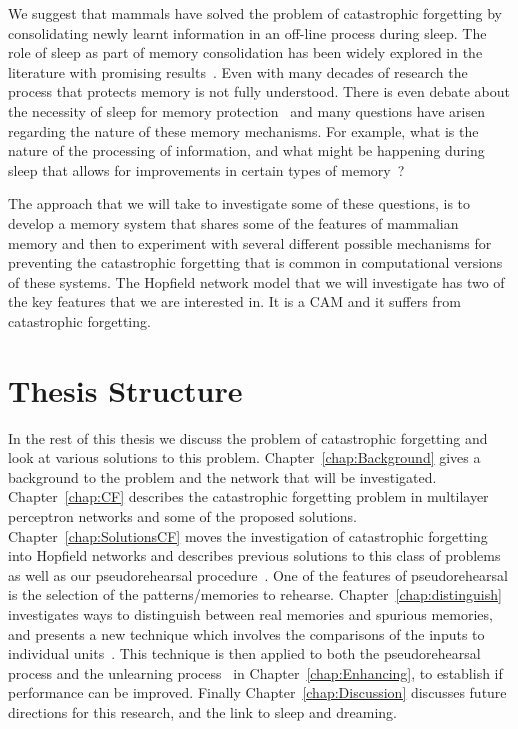 We suggest that mammals have solved the problem of catastrophic forgetting by consolidating newly learnt information in an off-line process during sleep.  The role of sleep as part of memory consolidation has been widely explored in the literature with promising results~\citep{Pearlman71, Pearlman73, Pearlman74, Pearlman79, Fishbein81, Smith91, Smith1993, Smith95, Hennevin95, Hennevin1995a, Smith96, Fishbein97, Meeter2004, Muzur05, Stickgold2005}.  
Even with many decades of research the process that protects memory is not fully understood.  
There is even debate about the necessity of sleep for memory protection~\citep{Siegel2001,Vertes2004,Siegel2005} and many questions have arisen regarding the nature of these memory mechanisms. For example, what is the nature of the processing of information, and what might be happening during sleep that allows for improvements in certain types of memory~\citep{Stickgold2001}?

The approach that we will take to investigate some of these questions, is to develop a memory system that shares some of the features of mammalian memory and then to experiment with several different possible mechanisms for preventing the catastrophic forgetting that is common in computational versions of these systems.  The Hopfield network model that we will investigate has two of the key features that we are interested in.  It is a CAM and it suffers from catastrophic forgetting.

\section{Thesis Structure}

In the rest of this thesis we discuss the problem of catastrophic forgetting and look at various solutions to this problem.  Chapter~\ref{chap:Background} gives a background to the problem and the network that will be investigated. Chapter~\ref{chap:CF} describes the catastrophic forgetting problem in multilayer perceptron networks and some of the proposed solutions. Chapter~\ref{chap:SolutionsCF} moves the investigation of catastrophic forgetting into Hopfield networks and describes previous solutions to this class of problems as well as our pseudorehearsal procedure~\citep{Robins1998,Robins1999}. One of the features of pseudorehearsal is the selection of the patterns/memories to rehearse.  Chapter~\ref{chap:distinguish} investigates ways to distinguish between real memories and spurious memories, and presents a new technique which involves the comparisons of the inputs to individual units~\citep{Robins2004}.  This technique is then applied to both the pseudorehearsal process and the unlearning process~\citep{Hopfield83,vanHemmen1997} in Chapter~\ref{chap:Enhancing}, to establish if performance can be improved.  Finally Chapter~\ref{chap:Discussion} discusses future directions for this research, and the link to sleep and dreaming. 

